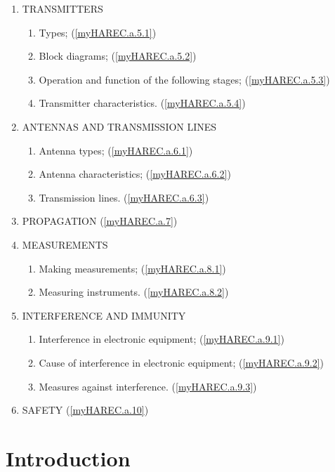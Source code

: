 \begin{enumerate}
\item TRANSMITTERS
\begin{enumerate}[noitemsep]
\item Types; (\ref{myHAREC.a.5.1})\label{HAREC.a.5.1}
\item Block diagrams; (\ref{myHAREC.a.5.2})\label{HAREC.a.5.2}
\item Operation and function of the following stages; (\ref{myHAREC.a.5.3})\label{HAREC.a.5.3}
\item Transmitter characteristics. (\ref{myHAREC.a.5.4})\label{HAREC.a.5.4}
\end{enumerate}
\item ANTENNAS AND TRANSMISSION LINES
\begin{enumerate}[noitemsep]
\item Antenna types; (\ref{myHAREC.a.6.1})\label{HAREC.a.6.1}
\item Antenna characteristics; (\ref{myHAREC.a.6.2})\label{HAREC.a.6.2}
\item Transmission lines. (\ref{myHAREC.a.6.3})\label{HAREC.a.6.3}
\end{enumerate}
\item PROPAGATION (\ref{myHAREC.a.7})\label{HAREC.a.7}
\item MEASUREMENTS
\begin{enumerate}[noitemsep]
\item Making measurements; (\ref{myHAREC.a.8.1})\label{HAREC.a.8.1}
\item Measuring instruments. (\ref{myHAREC.a.8.2})\label{HAREC.a.8.2}
\end{enumerate}
\item INTERFERENCE AND IMMUNITY
\begin{enumerate}[noitemsep]
\item Interference in electronic equipment; (\ref{myHAREC.a.9.1})\label{HAREC.a.9.1}
\item Cause of interference in electronic equipment; (\ref{myHAREC.a.9.2})\label{HAREC.a.9.2}
\item Measures against interference. (\ref{myHAREC.a.9.3})\label{HAREC.a.9.3}
\end{enumerate}
\item SAFETY (\ref{myHAREC.a.10})\label{HAREC.a.10}
\end{enumerate}

\section{Introduction}
